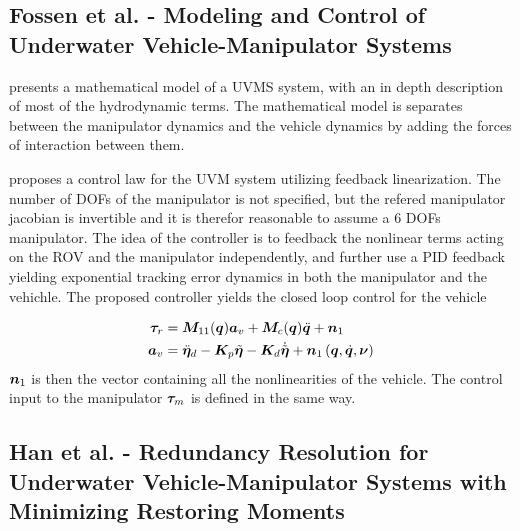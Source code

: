 \subsection{Fossen et al. - Modeling and Control of Underwater Vehicle-Manipulator Systems }

\cite{foss_schjolberg_modelling} presents a mathematical model of a UVMS system, with an in depth description of most of the hydrodynamic terms. The mathematical model is separates between the manipulator dynamics and the vehicle dynamics by adding the forces of interaction between them.

proposes a control law for the UVM system utilizing feedback linearization. The number of DOFs of the manipulator is not specified, but the refered manipulator jacobian is invertible and it is therefor reasonable to assume a 6 DOFs manipulator. The idea of the controller is to feedback the nonlinear terms acting on the ROV and the manipulator independently, and further use a PID feedback yielding exponential tracking error dynamics in both the manipulator and the vehichle. The proposed controller yields the closed loop control for the vehicle

\begin{align}
	\boldsymbol \tau_{r} & = \boldsymbol M_{11}(\boldsymbol q) \boldsymbol a_{v} + \boldsymbol M_{c}(\boldsymbol q) \ddot{\boldsymbol q} + \boldsymbol n_{1} \\
	\boldsymbol a_{v} &= \ddot{\boldsymbol \eta}_{d} - \boldsymbol K_{p} \tilde{\boldsymbol \eta} - \boldsymbol K_{d} \dot{\tilde{\boldsymbol \eta}} + \boldsymbol n_{1} \left( \boldsymbol q, \dot{\boldsymbol q},\boldsymbol \nu \right)
	\label{eq:fossenfbl}
\end{align}
$\boldsymbol n_{1}$ is then the vector containing all the nonlinearities of the vehicle. The control input to the manipulator $\boldsymbol \tau_{m}$ is defined in the same way. 



\subsection{Han et al. - 
Redundancy Resolution for Underwater Vehicle-Manipulator Systems
with Minimizing Restoring Moments }

